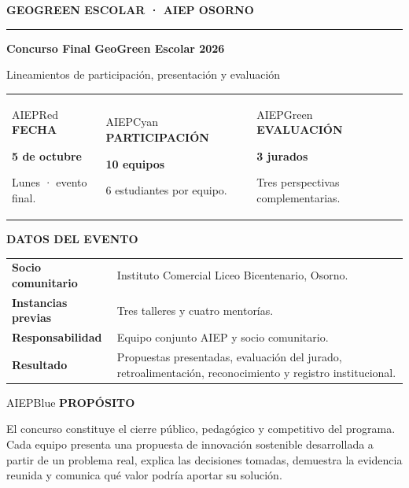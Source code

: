 \documentclass[10pt,a4paper]{article}
\newcommand{\kicker}[1]{%
  {\color{AIEPRed}\scriptsize\bfseries\MakeUppercase{#1}}\par\vspace{2.4mm}
  {\color{AIEPRed}\rule{13mm}{1.2pt}}\vspace{3mm}
}
\newcommand{\labeltext}[1]{%
  {\scriptsize\bfseries\color{AIEPSlate}\MakeUppercase{#1}}\par\vspace{1.2mm}
}
\begin{document}
\thispagestyle{fancy}
\kicker{GeoGreen Escolar · AIEP Osorno}
{\Huge\bfseries\color{AIEPNavy} Concurso Final GeoGreen Escolar 2026}\par
\vspace{2mm}
{\large\color{AIEPSlate} Lineamientos de participación, presentación y evaluación}\par
\vspace{7mm}

\begin{tabularx}{\textwidth}{Y Y Y}
\begin{softcard}[height=33mm,valign=top]{AIEPRed}
\labeltext{Fecha}
{\Large\bfseries\color{AIEPNavy}5 de octubre}\par
Lunes · evento final.
\end{softcard}
&
\begin{softcard}[height=33mm,valign=top]{AIEPCyan}
\labeltext{Participación}
{\Large\bfseries\color{AIEPNavy}10 equipos}\par
6 estudiantes por equipo.
\end{softcard}
&
\begin{softcard}[height=33mm,valign=top]{AIEPGreen}
\labeltext{Evaluación}
{\Large\bfseries\color{AIEPNavy}3 jurados}\par
Tres perspectivas complementarias.
\end{softcard}
\end{tabularx}

\vspace{4mm}
\begin{card}
\labeltext{Datos del evento}
\begin{tabularx}{\textwidth}{@{}L{39mm}Y@{}}
\textbf{Socio comunitario} & Instituto Comercial Liceo Bicentenario, Osorno.\\
\textbf{Instancias previas} & Tres talleres y cuatro mentorías.\\
\textbf{Responsabilidad} & Equipo conjunto AIEP y socio comunitario.\\
\textbf{Resultado} & Propuestas presentadas, evaluación del jurado, retroalimentación, reconocimiento y registro institucional.\\
\end{tabularx}
\end{card}

\begin{softcard}{AIEPBlue}
\labeltext{Propósito}
El concurso constituye el cierre público, pedagógico y competitivo del programa. Cada equipo
presenta una propuesta de innovación sostenible desarrollada a partir de un problema real,
explica las decisiones tomadas, demuestra la evidencia reunida y comunica qué valor podría
aportar su solución.
\end{softcard}
\end{document}
